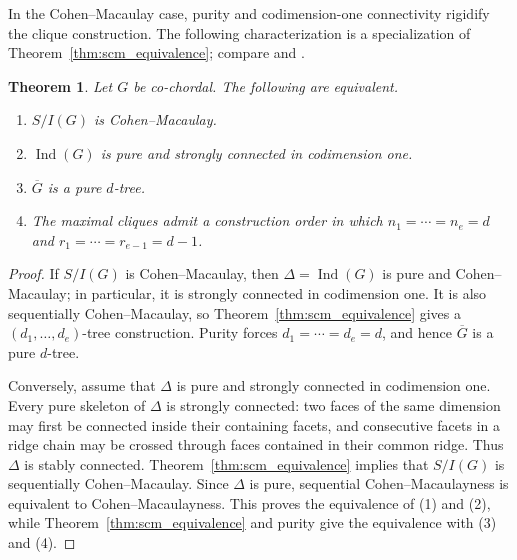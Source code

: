 \documentclass[12pt, reqno]{amsart}
\newtheorem{theorem}{Theorem}[section]
\theoremstyle{definition}
\numberwithin{equation}{section}
\begin{document}
	In the Cohen--Macaulay case, purity and codimension-one connectivity rigidify the clique construction.  The following characterization is a specialization of Theorem~\ref{thm:scm_equivalence}; compare \cite[Corollary~3.4]{ahmed2025} and \cite[Corollary~5.5]{namiq2026_icm}.
	
	\begin{theorem}\label{thm:cm_characterization}
Let $G$ be co-chordal.  The following are equivalent.
\begin{enumerate}
\item $S/I(G)$ is Cohen--Macaulay.
\item $\operatorname{Ind}(G)$ is pure and strongly connected in codimension one.
\item $\overline G$ is a pure $d$-tree.
\item The maximal cliques admit a construction order in which $n_1=\cdots=n_e=d$ and $r_1=\cdots=r_{e-1}=d-1$.
\end{enumerate}
\end{theorem}
\begin{proof}
If $S/I(G)$ is Cohen--Macaulay, then $\Delta=\operatorname{Ind}(G)$ is pure and Cohen--Macaulay; in particular, it is strongly connected in codimension one.  It is also sequentially Cohen--Macaulay, so Theorem~\ref{thm:scm_equivalence} gives a $(d_1,\ldots,d_e)$-tree construction.  Purity forces $d_1=\cdots=d_e=d$, and hence $\overline G$ is a pure $d$-tree.

Conversely, assume that $\Delta$ is pure and strongly connected in codimension one.  Every pure skeleton of $\Delta$ is strongly connected: two faces of the same dimension may first be connected inside their containing facets, and consecutive facets in a ridge chain may be crossed through faces contained in their common ridge.  Thus $\Delta$ is stably connected.  Theorem~\ref{thm:scm_equivalence} implies that $S/I(G)$ is sequentially Cohen--Macaulay.  Since $\Delta$ is pure, sequential Cohen--Macaulayness is equivalent to Cohen--Macaulayness.  This proves the equivalence of (1) and (2), while Theorem~\ref{thm:scm_equivalence} and purity give the equivalence with (3) and (4).
\end{proof}
	
\end{document}
